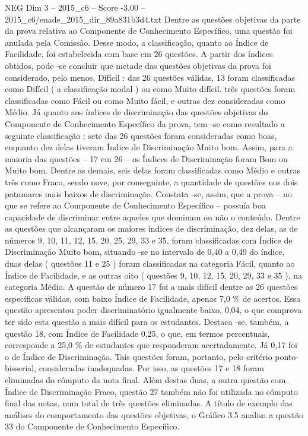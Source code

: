 \begin{textsample}{NEG Dim 3 – 2015\_c6 – Score -3.00 – 2015\_c6/enade\_2015\_dir\_89a831b3d4.txt}
Dentre as questões objetivas da parte da prova relativa ao Componente de Conhecimento Específico, uma questão foi anulada pela Comissão.
Desse modo, a classificação, quanto ao Índice de Facilidade, foi estabelecida com base em 26 questões.
A partir dos índices obtidos, pode -se concluir que metade das questões objetivas da prova foi considerado, pelo menos, Difícil : das 26 questões válidas, 13 foram classificadas como Difícil ( a classificação modal ) ou como Muito difícil. três questões foram classificadas como Fácil ou como Muito fácil, e outras dez consideradas como Médio.
Já quanto aos índices de discriminação das questões objetivas do Componente de Conhecimento Específico da prova, tem -se como resultado a seguinte classificação : sete das 26 questões foram consideradas como boas, enquanto dez delas tiveram Índice de Discriminação Muito bom.
Assim, para a maioria das questões – 17 em 26 – os Índices de Discriminação foram Bom ou Muito bom.
Dentre as demais, seis delas foram classificadas como Médio e outras três como Fraco, sendo nove, por conseguinte, a quantidade de questões nos dois patamares mais baixos de discriminação.
Constata -se, assim, que a prova – no que se refere ao Componente de Conhecimento Específico – possuía boa capacidade de discriminar entre aqueles que dominam ou não o conteúdo.
Dentre as questões que alcançaram os maiores índices de discriminação, dez delas, as de números 9, 10, 11, 12, 15, 20, 25, 29, 33 e 35, foram classificadas com Índice de Discriminação Muito bom, situando -se no intervalo de 0,40 a 0,49 do índice, duas delas ( questões 11 e 25 ) foram classificadas na categoria Fácil, quanto ao Índice de Facilidade, e as outras oito ( questões 9, 10, 12, 15, 20, 29, 33 e 35 ), na categoria Médio.
A questão de número 17 foi a mais difícil dentre as 26 questões específicas válidas, com baixo Índice de Facilidade, apenas 7,0 \% de acertos.
Essa questão apresentou poder discriminatório igualmente baixo, 0,04, o que comprova ter sido esta questão a mais difícil para os estudantes.
Destaca -se, também, a questão 18, com Índice de Facilidade 0,25, o que, em termos percentuais, corresponde a 25,0 \% de estudantes que responderam acertadamente.
Já 0,17 foi o de Índice de Discriminação.
Tais questões foram, portanto, pelo critério ponto-bisserial, consideradas inadequadas.
Por isso, as questões 17 e 18 foram eliminadas do cômputo da nota final.
Além destas duas, a outra questão com Índice de Discriminação Fraco, questão 27 também não foi utilizada no cômputo final das notas, num total de três questões eliminadas.
A título de exemplo das análises do comportamento das questões objetivas, o Gráfico 3.5 analisa a questão 33 do Componente de Conhecimento Específico.

\end{textsample}
